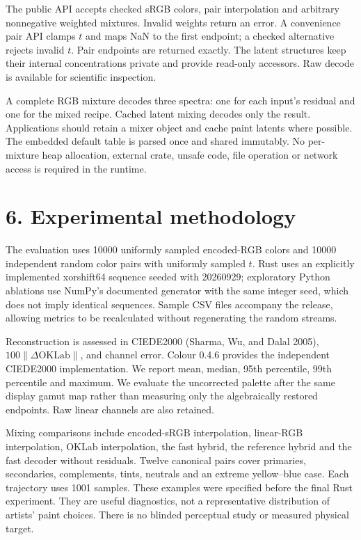 \documentclass[
  10pt,
  twocolumn]{article}
\begin{document}
The public API accepts checked sRGB colors, pair interpolation and
arbitrary nonnegative weighted mixtures. Invalid weights return an
error. A convenience pair API clamps \(t\) and maps NaN to the first
endpoint; a checked alternative rejects invalid \(t\). Pair endpoints
are returned exactly. The latent structures keep their internal
concentrations private and provide read-only accessors. Raw decode is
available for scientific inspection.

A complete RGB mixture decodes three spectra: one for each input's
residual and one for the mixed recipe. Cached latent mixing decodes only
the result. Applications should retain a mixer object and cache paint
latents where possible. The embedded default table is parsed once and
shared immutably. No per-mixture heap allocation, external crate, unsafe
code, file operation or network access is required in the runtime.

\hypertarget{experimental-methodology}{%
\section{6. Experimental methodology}\label{experimental-methodology}}

The evaluation uses 10000 uniformly sampled encoded-RGB colors and 10000
independent random color pairs with uniformly sampled \(t\). Rust uses
an explicitly implemented xorshift64 sequence seeded with 20260929;
exploratory Python ablations use NumPy's documented generator with the
same integer seed, which does not imply identical sequences. Sample CSV
files accompany the release, allowing metrics to be recalculated without
regenerating the random streams.

Reconstruction is assessed in CIEDE2000 (Sharma, Wu, and Dalal 2005),
\(100\|\Delta\mathrm{OKLab}\|\), and channel error. Colour 0.4.6
provides the independent CIEDE2000 implementation. We report mean,
median, 95th percentile, 99th percentile and maximum. We evaluate the
uncorrected palette after the same display gamut map rather than
measuring only the algebraically restored endpoints. Raw linear channels
are also retained.

Mixing comparisons include encoded-sRGB interpolation, linear-RGB
interpolation, OKLab interpolation, the fast hybrid, the reference
hybrid and the fast decoder without residuals. Twelve canonical pairs
cover primaries, secondaries, complements, tints, neutrals and an
extreme yellow--blue case. Each trajectory uses 1001 samples. These
examples were specified before the final Rust experiment. They are
useful diagnostics, not a representative distribution of artists' paint
choices. There is no blinded perceptual study or measured physical
target.
\end{document}
